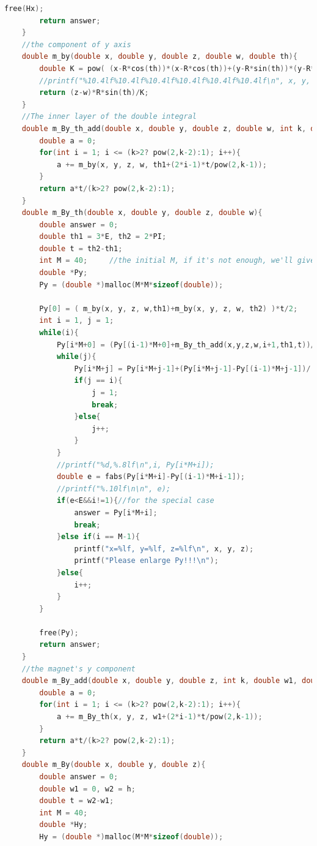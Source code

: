 \documentclass[AutoFakeBold]{LZUThesis}
\begin{document}
\begin{lstlisting}[language = C]
        free(Hx);
        return answer;
    }
    //the component of y axis
    double m_by(double x, double y, double z, double w, double th){
        double K = pow( (x-R*cos(th))*(x-R*cos(th))+(y-R*sin(th))*(y-R*sin(th))+(z-w)*(z-w) , 1.5);
        //printf("%10.4lf%10.4lf%10.4lf%10.4lf%10.4lf%10.4lf\n", x, y, z, w, th, (z-w)*R*sin(th)/K);
        return (z-w)*R*sin(th)/K;
    }
    //The inner layer of the double integral
    double m_By_th_add(double x, double y, double z, double w, int k, double th1, double t){
        double a = 0;
        for(int i = 1; i <= (k>2? pow(2,k-2):1); i++){
            a += m_by(x, y, z, w, th1+(2*i-1)*t/pow(2,k-1));
        }
        return a*t/(k>2? pow(2,k-2):1);
    }
    double m_By_th(double x, double y, double z, double w){
        double answer = 0;
        double th1 = 3*E, th2 = 2*PI;
        double t = th2-th1;
        int M = 40;     //the initial M, if it's not enough, we'll give you an alert and you need to enlarge M
        double *Py;
        Py = (double *)malloc(M*M*sizeof(double));
    
        Py[0] = ( m_by(x, y, z, w,th1)+m_by(x, y, z, w, th2) )*t/2;
        int i = 1, j = 1;
        while(i){
            Py[i*M+0] = (Py[(i-1)*M+0]+m_By_th_add(x,y,z,w,i+1,th1,t))/2;
            while(j){
                Py[i*M+j] = Py[i*M+j-1]+(Py[i*M+j-1]-Py[(i-1)*M+j-1])/(pow(4,j)-1);
                if(j == i){
                    j = 1;
                    break;
                }else{
                    j++;
                }
            }
            //printf("%d,%.8lf\n",i, Py[i*M+i]);
            double e = fabs(Py[i*M+i]-Py[(i-1)*M+i-1]);
            //printf("%.10lf\n\n", e);
            if(e<E&&i!=1){//for the special case            
                answer = Py[i*M+i];
                break;
            }else if(i == M-1){
                printf("x=%lf, y=%lf, z=%lf\n", x, y, z);
                printf("Please enlarge Py!!!\n");
            }else{
                i++;
            }
        }
    
        free(Py);
        return answer;
    }
    //the magnet's y component
    double m_By_add(double x, double y, double z, int k, double w1, double t){
        double a = 0;
        for(int i = 1; i <= (k>2? pow(2,k-2):1); i++){
            a += m_By_th(x, y, z, w1+(2*i-1)*t/pow(2,k-1));
        }
        return a*t/(k>2? pow(2,k-2):1);
    }
    double m_By(double x, double y, double z){
        double answer = 0;
        double w1 = 0, w2 = h;
        double t = w2-w1;
        int M = 40;
        double *Hy;
        Hy = (double *)malloc(M*M*sizeof(double));
    

\end{lstlisting}
\end{document}
